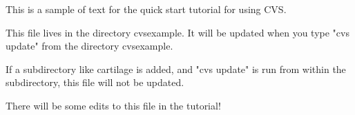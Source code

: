 This is a sample of text for the quick
start tutorial for using CVS.

This file lives in the directory cvsexample.
It will be updated when you type "cvs update"
from the directory cvsexample.  

If a subdirectory like cartilage is added, and
"cvs update" is run from within the subdirectory,
this file will not be updated.

There will be some edits to this file in the
tutorial!

